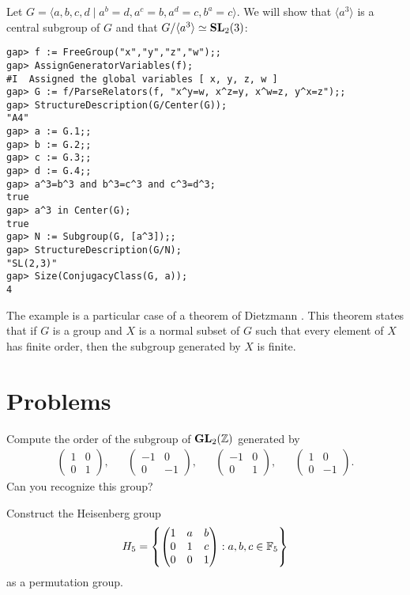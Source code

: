{\begin{example}
\label{exa:Dietzmann}
Let $G=\langle a,b,c,d \mid a^b=d,a^c=b,a^d=c,b^a=c\rangle$. 
We will show that $\langle a^3\rangle$ is a central subgroup of $G$ 
and that $G/\langle a^3\rangle\simeq\mathbf{SL}_2(3)$: 
\begin{lstlisting}
gap> f := FreeGroup("x","y","z","w");;
gap> AssignGeneratorVariables(f);
#I  Assigned the global variables [ x, y, z, w ]
gap> G := f/ParseRelators(f, "x^y=w, x^z=y, x^w=z, y^x=z");;
gap> StructureDescription(G/Center(G));
"A4"
gap> a := G.1;;
gap> b := G.2;;
gap> c := G.3;;
gap> d := G.4;;
gap> a^3=b^3 and b^3=c^3 and c^3=d^3;
true
gap> a^3 in Center(G);
true
gap> N := Subgroup(G, [a^3]);;
gap> StructureDescription(G/N);
"SL(2,3)"
gap> Size(ConjugacyClass(G, a));
4
\end{lstlisting}
The example is a particular case of a theorem of Dietzmann \cite[Theorem 5.10]{MR2426855}. This theorem states that
if $G$ is a group and $X$ is a normal subset of $G$ such that 
every element of $X$ has finite order, then the subgroup
generated by $X$ is finite. 
\end{example}

}


\section{Problems}


\begin{prob}
Compute the order of the subgroup of $\mathbf{GL}_2(\mathbb{Z})$ generated by
\begin{align*}
    \begin{pmatrix}
        1 & 0\\
        0 & 1
    \end{pmatrix},
    &&
    \begin{pmatrix}
        -1 & 0\\
        0 & -1
    \end{pmatrix},
    &&
    \begin{pmatrix}
        -1 & 0\\
        0 & 1
    \end{pmatrix},
    &&
    \begin{pmatrix}
        1 & 0\\
        0 & -1
    \end{pmatrix}.
\end{align*}
Can you recognize this group?
\end{prob}

\begin{prob}
  Construct the Heisenberg group 
  \[
H_5=\left\{\begin{pmatrix}
    1 & a & b\\
    0 & 1 & c\\
    0 & 0 & 1
    \end{pmatrix}:a,b,c\in\mathbb{F}_5\right\}
\]
as a permutation group. 
\end{prob}

